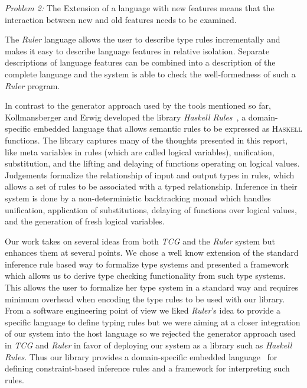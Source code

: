 \smallskip
\textit{Problem 2:} The Extension of a language with new features
means that the interaction between new and old features needs to be
examined.

\smallskip
The \textit{Ruler} language allows the user to describe type rules
incrementally and makes it easy to describe language features in
relative isolation. Separate descriptions of language features can be
combined into a description of the complete language and the system is
able to check the well-formedness of such a \textit{Ruler} program.

\bigskip

In contrast to the generator approach used by the tools mentioned so
far, Kollmansberger and Erwig developed the library \textit{Haskell
  Rules}~\cite{Erwig2006}, a domain-specific embedded language that
allows semantic rules to be expressed as \textsc{Haskell}
functions. The library captures many of the thoughts presented in this
report, like meta variables in rules (which are called logical
variables), unification, substitution, and the lifting and delaying of
functions operating on logical values. Judgements formalize the
relationship of input and output types in rules, which allows a set of
rules to be associated with a typed relationship. Inference in their
system is done by a non-deterministic backtracking monad which handles
unification, application of substitutions, delaying of functions over
logical values, and the generation of fresh logical variables.

\bigskip

Our work takes on several ideas from both \textit{TCG} and the
\textit{Ruler} system but enhances them at several points. We chose a
well know extension of the standard inference rule based way to
formalize type systems and presented a framework which allows us to
derive type checking functionality from such type systems. This allows
the user to formalize her type system in a standard way and requires
minimum overhead when encoding the type rules to be used with our
library.  From a software engineering point of view we liked
\textit{Ruler}'s idea to provide a specific language to define typing
rules but we were aiming at a closer integration of our system into
the host language so we rejected the generator approach used in
\textit{TCG} and \textit{Ruler} in favor of deploying our system as a
library such as \textit{Haskell Rules}. Thus our library provides a
domain-specific embedded language~\cite{Hudak1998} for defining
constraint-based inference rules and a framework for interpreting such
rules.


